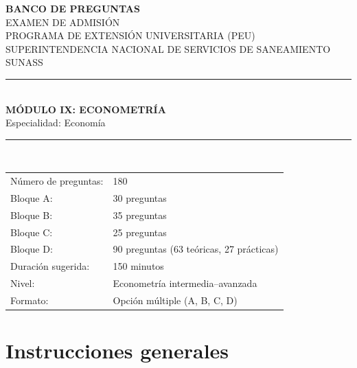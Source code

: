\documentclass[11pt,a4paper]{article}
\begin{document}
\begin{titlepage}
\thispagestyle{empty}
\centering
\backboneportadaheader

{\Large\bfseries BANCO DE PREGUNTAS}\\[0.35cm]
{\large EXAMEN DE ADMISIÓN}\\[0.15cm]
{\large PROGRAMA DE EXTENSIÓN UNIVERSITARIA (PEU)}\\[0.15cm]
{\large SUPERINTENDENCIA NACIONAL DE SERVICIOS DE SANEAMIENTO}\\[0.05cm]
{\large SUNASS}\\[1.0cm]

\rule{\linewidth}{0.9pt}\\[0.55cm]
{\LARGE\bfseries MÓDULO IX: ECONOMETRÍA}\\[0.35cm]
{\large Especialidad: Economía}\\[0.55cm]
\rule{\linewidth}{0.9pt}\\[1.0cm]

\begin{tabular}{ll}
\toprule
Número de preguntas: & 180 \\
Bloque A: & 30 preguntas \\
Bloque B: & 35 preguntas \\
Bloque C: & 25 preguntas \\
Bloque D: & 90 preguntas (63 teóricas, 27 prácticas) \\
Duración sugerida: & 150 minutos \\
Nivel: & Econometría intermedia--avanzada \\
Formato: & Opción múltiple (A, B, C, D) \\
\bottomrule
\end{tabular}

\vfill
\backboneportadafooter
\end{titlepage}

\section*{Instrucciones generales}
\end{document}
